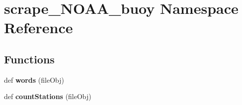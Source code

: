 \hypertarget{namespacescrape___n_o_a_a__buoy}{}\section{scrape\+\_\+\+N\+O\+A\+A\+\_\+buoy Namespace Reference}
\label{namespacescrape___n_o_a_a__buoy}
\subsection*{Functions}
\begin{DoxyCompactItemize}
\item 
\mbox{\label{namespacescrape___n_o_a_a__buoy_ac1297b9efa5abc85c1661691635c3f41}} 
def {\bfseries words} (file\+Obj)
\item 
\mbox{\label{namespacescrape___n_o_a_a__buoy_adb1ea63f42f9a21619ae902191575640}} 
def {\bfseries count\+Stations} (file\+Obj)
\end{DoxyCompactItemize}
